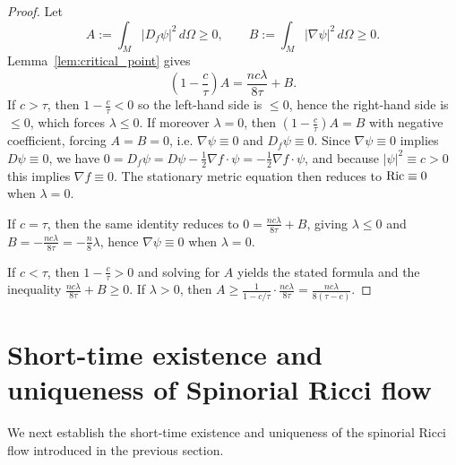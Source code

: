 \documentclass{amsart}
\theoremstyle{definition}
\theoremstyle{remark}
\numberwithin{equation}{section}
\newcommand{\Ric}{\textup{Ric}}
\begin{document}
\begin{proof}
Let
\[
A:=\int_M |D_f\psi|^2\,d\Omega\ge 0,\qquad
B:=\int_M |\nabla\psi|^2\,d\Omega\ge 0.
\]
Lemma~\ref{lem:critical_point} gives
\[
\left(1-\frac{c}{\tau}\right)A=\frac{nc\lambda}{8\tau}+B.
\]
If $c>\tau$, then $1-\frac{c}{\tau}<0$ so the left-hand side is $\le 0$, hence the right-hand side
is $\le 0$, which forces $\lambda\le 0$. If moreover $\lambda=0$, then
$\left(1-\frac{c}{\tau}\right)A=B$ with negative coefficient, forcing $A=B=0$, i.e.
$\nabla\psi\equiv 0$ and $D_f\psi\equiv 0$. Since $\nabla\psi\equiv 0$ implies $D\psi\equiv 0$,
we have $0 =D_f\psi=D\psi-\frac12\nabla f\cdot\psi=-\frac12\nabla f\cdot\psi$, and because
$|\psi|^2\equiv c>0$ this implies $\nabla f\equiv 0$. The stationary metric equation then reduces
to $\Ric\equiv 0$ when $\lambda=0$.

If $c=\tau$, then the same identity reduces to $0=\frac{nc\lambda}{8\tau}+B$, giving $\lambda\le 0$
and $B=-\frac{nc\lambda}{8\tau}=-\frac{n}{8}\lambda$, hence $\nabla\psi\equiv 0$ when $\lambda=0$.

If $c<\tau$, then $1-\frac{c}{\tau}>0$ and solving for $A$ yields the stated formula and the
inequality $\frac{nc\lambda}{8\tau}+B\ge 0$. If $\lambda>0$, then $A\ge \frac{1}{1-c/\tau}\cdot
\frac{nc\lambda}{8\tau}=\frac{nc\lambda}{8(\tau-c)}$.
\end{proof}

\color{black}




\section{Short-time existence and uniqueness of Spinorial Ricci flow}

We next establish the short-time existence and uniqueness of the spinorial Ricci flow introduced in the previous section.
\end{document}
